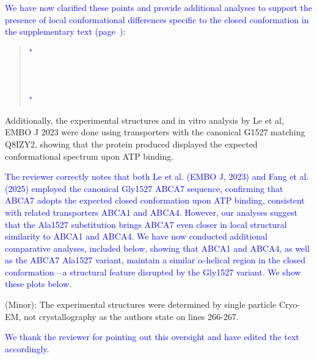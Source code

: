 {\textcolor{blue}{We have now clarified these points and provide additional analyses to support the presence of local conformational differences specific to the closed conformation in the supplementary text (page~\pageref{quoteM-label}):}
\begin{quote}
	\textcolor{blue}{"}\quoteM\\\\
    \quoteN\\\\
    \quoteO\textcolor{blue}{"}
\end{quote}

Additionally, the experimental structures and in vitro analysis by Le et al, EMBO J 2023 were done using transporters with the canonical G1527 matching Q8IZY2, showing that the protein produced displayed the expected conformational spectrum upon ATP binding.

\textcolor{blue}{The reviewer correctly notes that both Le et al. (EMBO J, 2023) and Fang et al. (2025) \cite{Fang2025} employed the canonical Gly1527 ABCA7 sequence, confirming that ABCA7 adopts the expected closed conformation upon ATP binding, consistent with related transporters ABCA1 and ABCA4. However, our analyses suggest that the Ala1527 substitution brings ABCA7 even closer in local structural similarity to ABCA1 and ABCA4. We have now conducted additional comparative analyses, included below, showing that ABCA1 and ABCA4, as well as the ABCA7 Ala1527 variant, maintain a similar $\alpha$-helical region in the closed conformation—a structural feature disrupted by the Gly1527 variant. We show these plots below.}

(Minor): The experimental structures were determined by single particle Cryo-EM, not crystallography as the authors state on lines 266-267.

\textcolor{blue}{We thank the reviewer for pointing out this oversight and have edited the text accordingly.}








}
